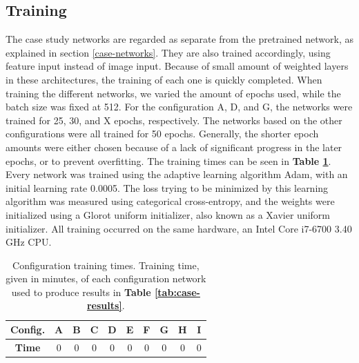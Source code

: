 
\subsection{Training} \label{case-training}



The case study networks are regarded as separate from the pretrained network, as explained in section \ref{case-networks}. They are also trained accordingly, using feature input instead of image input. Because of small amount of weighted layers in these architectures, the training of each one is quickly completed. When training the different networks, we varied the amount of epochs used, while the batch size was fixed at 512. For the configuration A, D, and G, the networks were trained for 25, 30, and X epochs, respectively. The networks based on the other configurations were all trained for 50 epochs. Generally, the shorter epoch amounts were either chosen because of a lack of significant progress in the later epochs, or to prevent overfitting. The training times can be seen in \textbf{Table \ref{tab:train-times}}. Every network was trained using the adaptive learning algorithm Adam, with an initial learning rate 0.0005. The loss trying to be minimized by this learning algorithm was measured using categorical cross-entropy, and the weights were initialized using a Glorot uniform initializer, also known as a Xavier uniform initializer. All training occurred on the same hardware, an Intel\textregistered{} Core\texttrademark{} i7-6700 3.40 GHz CPU. 



\begin{table}[h!]
\begin{center}
\begin{tabular}{|c|c|c|c|c|c|c|c|c|c|}
\hline
\textbf{Config.} & A & B & C & D & E & F & G & H & I \\ \hline
\textbf{Time} & 0 & 0 & 0 & 0 & 0 & 0 & 0 & 0 & 0 \\ \hline
\end{tabular}
\end{center}
\caption[Configuration training times]{Configuration training times. Training time, given in minutes, of each configuration network used to produce results in \textbf{Table \ref{tab:case-results}}.}
\label{tab:train-times}
\end{table}


\cleardoublepage